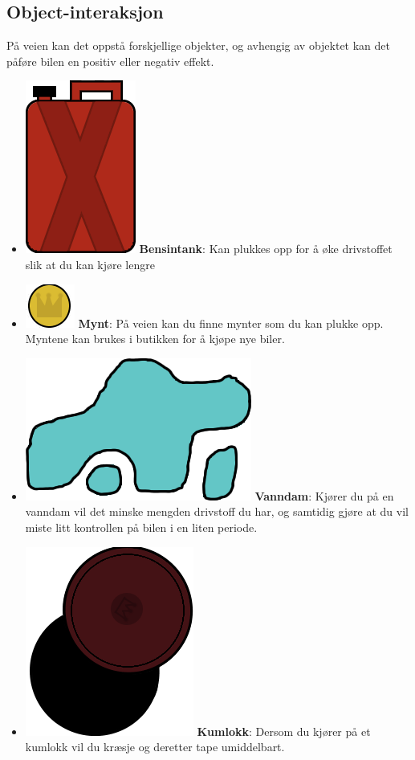\documentclass[paper=a4]{article}
\begin{document}
\subsection{Object-interaksjon}
På veien kan det oppstå forskjellige objekter, og avhengig av objektet kan det påføre bilen en positiv eller negativ effekt. \\
{\renewcommand\labelitemi{}
\begin{itemize}
	\item \includegraphics[scale=0.2]{images/gastank.png} \textbf{Bensintank}: Kan plukkes opp for å øke drivstoffet slik at du kan kjøre lengre 
	\item \includegraphics[scale=0.5]{images/coin.png} \textbf{Mynt}: På veien kan du finne mynter som du kan plukke opp.
																Myntene kan brukes i butikken for å kjøpe nye biler.
	\item \includegraphics[scale=0.2]{images/puddle.png} \textbf{Vanndam}: Kjører du på en vanndam vil det minske mengden drivstoff du har,
																og samtidig gjøre at du vil miste litt kontrollen på bilen i en liten periode. 
	\item \includegraphics[scale=0.2]{images/manhole.png} \textbf{Kumlokk}: Dersom du kjører på et kumlokk vil du kræsje og deretter tape umiddelbart.

\end{itemize}}
\end{document}
